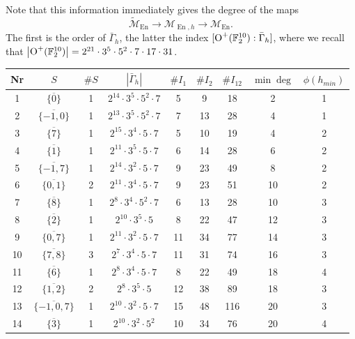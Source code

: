 \documentclass[a4paper,11pt]{article}
\newcommand{\FF}{\mathbb F}
\newcommand{\cM}{\mathcal M}
\newcommand{\Orth}{\mathop{\null\mathrm {O}}\nolimits}
\newcommand{\En}{\mathop{\mathrm {En}}\nolimits}
\begin{document}
Note that this information immediately gives the degree of the maps
\begin{equation*}
\widetilde {\cM}_{\En} \to \cM_{\En,h} \to {\cM}_{\En}.
\end{equation*}
The first is the order of $\bar \Gamma_h$, the latter the index $[\Orth^+(\FF_2^{10}) : \bar \Gamma_h]$, where we recall that
$\left\vert \Orth^+(\FF_2^{10}) \right\vert = 2^{21} \cdot 3^5 \cdot 5^2 \cdot 7\cdot 17 \cdot 31$.

\begin{table}
\begin{center}
{\scriptsize
\begin{tabular}{|c|c|c|c|c|c|c|c|c|}
\hline
Nr & $S$ & $\# S$ &  $|\bar \Gamma_h|$  & $\# I_1$  & $\# I_2$ & $\# I_{12}$ & $\min \deg$ & $\phi(h_{min})$\\
\hline
1 & $\overline{\{0\}}$ & 1 & $2^{14} \cdot 3^{5} \cdot 5^{2} \cdot 7$ & 5 & 9 & 18 & 2 & 1\\
2 & $\overline{\{-1,0\}}$ & 1 & $2^{13} \cdot 3^{5} \cdot 5^{2} \cdot 7$ & 7 & 13 & 28 & 4 & 1\\
3 & $\overline{\{7\}}$ & 1 & $2^{15} \cdot 3^{4} \cdot 5 \cdot 7$ & 5 & 10 & 19 & 4 & 2\\
4 & $\overline{\{1\}}$ & 1 & $2^{11} \cdot 3^{5} \cdot 5 \cdot 7$ & 6 & 14 & 28 & 6 & 2\\
5 & $\overline{\{-1,7\}}$ & 1 & $2^{14} \cdot 3^{2} \cdot 5 \cdot 7$ & 9 & 23 & 49 & 8 & 2\\
6 & $\overline{\{0,1\}}$ & 2 & $2^{11} \cdot 3^{4} \cdot 5 \cdot 7$ & 9 & 23 & 51 & 10 & 2\\
7 & $\overline{\{8\}}$ & 1 & $2^{8} \cdot 3^{4} \cdot 5^{2} \cdot 7$ & 6 & 13 & 28 & 10 & 3\\
8 & $\overline{\{2\}}$ & 1 & $2^{10} \cdot 3^{5} \cdot 5$ & 8 & 22 & 47 & 12 & 3\\
9 & $\overline{\{0,7\}}$ & 1 & $2^{11} \cdot 3^{2} \cdot 5 \cdot 7$ & 11 & 34 & 77 & 14 & 3\\
10 & $\overline{\{7,8\}}$ & 3 & $2^{7} \cdot 3^{4} \cdot 5 \cdot 7$ & 11 & 31 & 74 & 16 & 3\\
11 & $\overline{\{6\}}$ & 1 & $2^{8} \cdot 3^{4} \cdot 5 \cdot 7$ & 8 & 22 & 49 & 18 & 4\\
12 & $\overline{\{1,2\}}$ & 2 & $2^{8} \cdot 3^{5} \cdot 5$ & 12 & 38 & 89 & 18 & 3\\
13 & $\overline{\{-1,0,7\}}$ & 1 & $2^{10} \cdot 3^{2} \cdot 5 \cdot 7$ & 15 & 48 & 116 & 20 & 3\\
14 & $\overline{\{3\}}$ & 1 & $2^{10} \cdot 3^{2} \cdot 5^{2}$ & 10 & 34 & 76 & 20 & 4\\

\end{tabular}}
\end{center}
\end{table}
\end{document}
